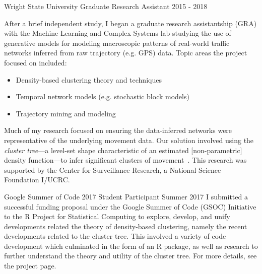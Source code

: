 \documentclass[11pt,a4paper,sans]{moderncv} %
\begin{document}
			 {Wright State University}
			 {Graduate Research Assistant}
			 {2015 - 2018}{}
{  \vspace{3pt}
After a brief independent study, I began a graduate research assistantship (GRA) with the Machine Learning and Complex Systems lab studying the use of generative models for modeling macroscopic patterns of real-world traffic networks inferred from raw trajectory (e.g. GPS) data.
Topic areas the project focused on included: 
	\begin{itemize}
		\item Density-based clustering theory and techniques
		\item Temporal network models (e.g. stochastic block models) 
		\item Trajectory mining and modeling
	\end{itemize}
Much of my research focused on ensuring the data-inferred networks were representative of the underlying movement data. Our solution involved using the {\em cluster tree}---a level-set shape characteristic of an estimated [non-parametric] density function---to infer significant clusters of movement~\cite{poi_paper}. This research was supported by the Center for Surveillance Research, a National Science Foundation I/UCRC.
}
\vspace{0.75em}

			 {Google Summer of Code 2017}
			 {Student Participant}
			 {Summer 2017}{}{\vspace{3pt} %
			 I submitted a successful funding proposal under the Google Summer of Code (GSOC) Initiative to the R Project for Statistical Computing to explore, develop, and unify developments related the theory of density-based clustering, namely the recent developments related to the cluster tree. This involved a variety of code development which culminated in the form of an R package, as well as research to further understand the theory and utility of the cluster tree. For more details, see the project page.\footnotemark 
			 } 
\vspace{0.75em}
\end{document}
